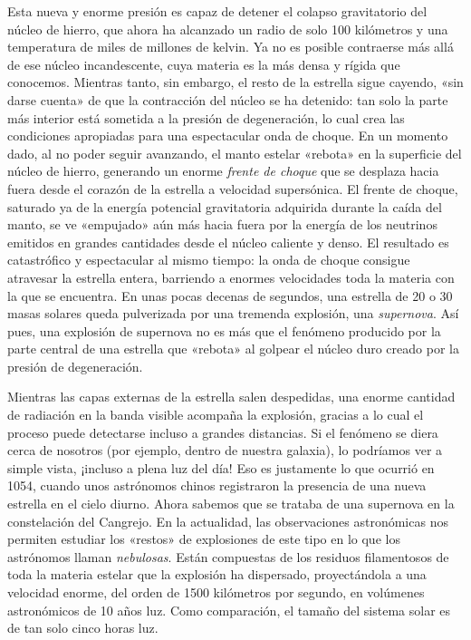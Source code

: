 Esta nueva y enorme presión es capaz de detener el colapso gravitatorio del núcleo de hierro, que ahora ha alcanzado un radio de solo 100 kilómetros y una temperatura de miles de millones de kelvin. Ya no es posible contraerse más allá de ese núcleo incandescente, cuya materia es la más densa y rígida que conocemos. Mientras tanto, sin embargo, el resto de la estrella sigue cayendo, «sin darse cuenta» de que la contracción del núcleo se ha detenido: tan solo la parte más interior está sometida a la presión de degeneración, lo cual crea las condiciones apropiadas para una espectacular onda de choque. En un momento dado, al no poder seguir avanzando, el manto estelar «rebota» en la superficie del núcleo de hierro, generando un enorme \emph{frente de choque} que se desplaza hacia fuera desde el corazón de la estrella a velocidad supersónica. El frente de choque, saturado ya de la energía potencial gravitatoria adquirida durante la caída del manto, se ve «empujado» aún más hacia fuera por la energía de los neutrinos emitidos en grandes cantidades desde el núcleo caliente y denso. El resultado es catastrófico y espectacular al mismo tiempo: la onda de choque consigue atravesar la estrella entera, barriendo a enormes velocidades toda la materia con la que se encuentra. En unas pocas decenas de segundos, una estrella de 20 o 30 masas solares queda pulverizada por una tremenda explosión, una \emph{supernova}. Así pues, una explosión de supernova no es más que el fenómeno producido por la parte central de una estrella que «rebota» al golpear el núcleo duro creado por la presión de degeneración.

Mientras las capas externas de la estrella salen despedidas, una enorme cantidad de radiación en la banda visible acompaña la explosión, gracias a lo cual el proceso puede detectarse incluso a grandes distancias. Si el fenómeno se diera cerca de nosotros (por ejemplo, dentro de nuestra galaxia), lo podríamos ver a simple vista, ¡incluso a plena luz del día! Eso es justamente lo que ocurrió en 1054, cuando unos astrónomos chinos registraron la presencia de una nueva estrella en el cielo diurno. Ahora sabemos que se trataba de una supernova en la constelación del Cangrejo. En la actualidad, las observaciones astronómicas nos permiten estudiar los «restos» de explosiones de este tipo en lo que los astrónomos llaman \emph{nebulosas}. Están compuestas de los residuos filamentosos de toda la materia estelar que la explosión ha dispersado, proyectándola a una velocidad enorme, del orden de 1500 kilómetros por segundo, en volúmenes astronómicos de 10 años luz. Como comparación, el tamaño del sistema solar es de tan solo cinco horas luz.

